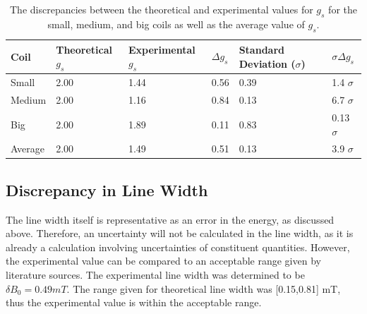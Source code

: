 \documentclass[a4paper]{article}
\begin{document}
\begin{table}[H]
  \caption{The discrepancies between the theoretical and experimental values for
    \( g_s \) for the small, medium, and big coils as well as the average value
    of \( g_s \).}
  \begin{center}
    \begin{tabular}{|l|l|l|l|l|l|}
      \hline
      Coil & Theoretical \( g_s \) & Experimental \( g_s \) & \( \Delta g_s \) &
                                                                                 Standard
                                                                                 Deviation
                                                                                 (\(
                                                                                 \sigma
                                                                                 \)) &
                                                                                 \(
                                                                                 \sigma
                                                                                 \Delta
                                                                                 g_s
                                                                                 \)
      \\
      \hline
      Small & 2.00 & 1.44 & 0.56 & 0.39 & 1.4 \( \sigma \) \\
      Medium & 2.00 & 1.16 & 0.84 & 0.13 & 6.7 \( \sigma \) \\
      Big & 2.00 & 1.89 & 0.11 & 0.83 & 0.13 \( \sigma \) \\
      \hline
      Average & 2.00 & 1.49 & 0.51 & 0.13 & 3.9 \( \sigma \) \\
      \hline
    \end{tabular}
  \end{center}
  \label{tab:discrepancyG}
\end{table}


\subsection{Discrepancy in Line Width}
\qq The line width itself is representative as an error in the energy, as discussed above. Therefore, an uncertainty will not be calculated in the line width, as it is already a calculation involving uncertainties of constituent quantities. However, the experimental value can be compared to an acceptable range given by literature sources. The experimental line width was determined to be $\delta B_0 = 0.49 mT$. The range given for theoretical line width was [0.15,0.81] mT, thus the experimental value is within the acceptable range.
\end{document}

